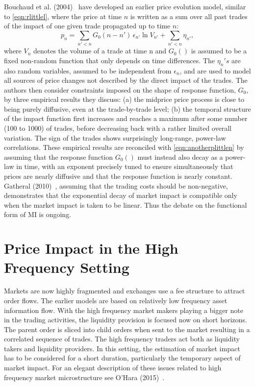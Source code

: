 Bouchaud et al. (2004)~\cite{bouchaud2004} have developed an earlier price evolution model, similar to \eqref{eqn:rlittlel}, where the price at time $n$ is written as a sum over all past trades of the impact of one given trade propagated up to time $n$:
	\begin{equation} \label{eqn:anotherplittlen}
	p_n = \sum_{n'<n} G_0(n - n')\,\epsilon_{n'} \ln{V_{n'}} + \sum_{n'<n} \eta_{n'},
	\end{equation}
where $V_n$ denotes the volume of a trade at time n and $G_0()$ is assumed to be a fixed non-random function that only depends on time differences. The $\eta_n's$ are also random variables, assumed to be independent from $\epsilon_n$, and are used to model all sources of price changes not described by the direct impact of the trades. The authors then consider constraints imposed on the shape of response function, $G_0$, by three empirical results they discuss: (a) the midprice price process is close to being purely diffusive, even at the trade-by-trade level; (b) the temporal structure of the impact function first increases and reaches a maximum after some number (100 to 1000) of trades, before decreasing back with a rather limited overall variation. The sign of the trades shows surprisingly long-range, power-law correlations. These empirical results are reconciled with \eqref{eqn:anotherplittlen} by assuming that the response function $G_0()$ must instead also decay as a power-law in time, with an exponent precisely tuned to ensure simultaneously that prices are nearly diffusive and that the response function is nearly constant. Gatheral (2010)~\cite{gatheral}, assuming that the trading costs should be non-negative, demonstrates that the exponential decay of market impact is compatible only when the market impact is taken to be linear. Thus the debate on the functional form of MI is ongoing. 



\section{Price Impact in the High Frequency Setting}

Markets are now highly fragmented and exchanges use a fee structure to attract order flows. The earlier models are based on relatively low frequency asset information flow. With the high frequency market makers playing a bigger note in the trading activities, the liquidity provision is focused now on short horizons. The parent order is sliced into child orders when sent to the market resulting in a correlated sequence of trades. The high frequency traders act both as liquidity takers and liquidity providers. In this setting, the estimation of market impact has to be considered for a short duration, particularly the temporary aspect of market impact. For an elegant description of these issues related to high frequency market microstructure see O'Hara (2015)~\cite{ohara15hfmm}.


